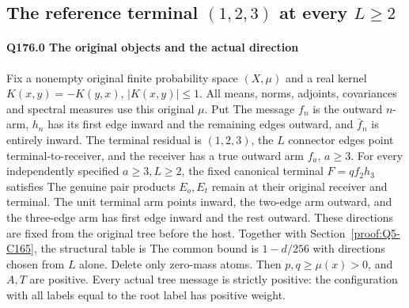 \subsection{The reference terminal $(1,\allowbreak 2,\allowbreak 3)$ at every $L\ge\allowbreak 2$}\label{proof:Q5-C176}
\paragraph{Q176.0 The original objects and the actual direction}\label{part:Q176.0}
Fix a nonempty original finite probability space $(X,\allowbreak \mu)$ and a real
kernel $K(x,\allowbreak y)=\allowbreak -K(y,\allowbreak x)$, $|K(x,\allowbreak y)|\le\allowbreak 1$. All means, norms, adjoints,
covariances and spectral measures use this original $\mu$. Put
The message $f_n$ is the outward $n$-arm, $h_n$ has its first edge inward
and the remaining edges outward, and $\bar f_n$ is entirely inward.
The terminal residual is $(1,\allowbreak 2,\allowbreak 3)$, the $L$ connector edges point
terminal-to-receiver, and the receiver has a true outward arm $f_a$, $a\ge\allowbreak 3$.
For every independently specified $a\ge\allowbreak 3,\allowbreak L\ge\allowbreak 2$, the fixed canonical
terminal $F=\allowbreak qf_2h_3$ satisfies
The genuine pair products $E_o,\allowbreak E_t$ remain at their original receiver
and terminal. The unit terminal arm points inward, the two-edge arm
outward, and the three-edge arm has first edge inward and the rest outward.
These directions are fixed from the original tree before the host.
Together with Section~\ref{proof:Q5-C165}, the structural table is
The common bound is $1-d/256$ with directions chosen from $L$ alone.
Delete only zero-mass atoms. Then $p,\allowbreak q\ge\allowbreak \mu(x)>\allowbreak 0$, and $A,\allowbreak T$ are
positive. Every actual tree message is strictly positive: the configuration
with all labels equal to the root label has positive weight.

